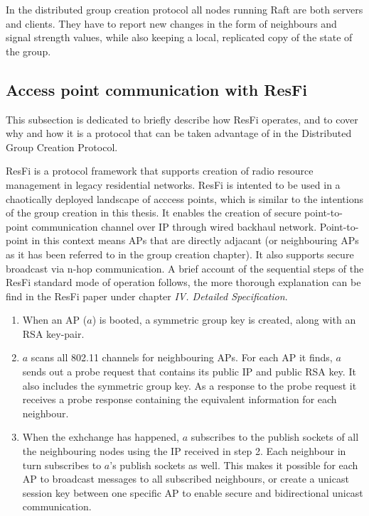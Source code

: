 In the distributed group creation protocol all nodes running Raft are both servers and clients. They have to report new changes in the form of neighbours and signal strength values,
while also keeping a local, replicated copy of the state of the group.

\subsection{Access point communication with ResFi}
This subsection is dedicated to briefly describe how ResFi operates, and to cover why and how it is a protocol that can be taken advantage of in the Distributed Group Creation Protocol. 

ResFi is a protocol framework that supports creation of radio resource management in legacy residential networks. ResFi is intented to be used in  a chaotically deployed landscape of acccess points,
which is similar to the intentions of the group creation in this thesis. It enables the creation of secure point-to-point communication channel over IP through wired backhaul network. 
Point-to-point in this context means APs that are directly adjacant (or neighbouring APs as it has been referred to in the group creation chapter).
It also supports secure broadcast via n-hop communication. A brief account of the sequential steps of the ResFi standard mode of operation follows,
the more thorough explanation can be find in the ResFi paper \cite{resfi} under chapter \textit{IV. Detailed Specification}.

\begin{enumerate}
	\item When an AP ($a$) is booted, a symmetric group key is created, along with an RSA key-pair. 
	\item $a$ scans all 802.11 channels for neighbouring APs. For each AP it finds, $a$ sends out a probe request that contains its public IP and public RSA key. It also includes
		the symmetric group key. As a response to the probe request it receives a probe response containing the equivalent information for each neighbour. 
	\item When the exhchange has happened, $a$ subscribes to the publish sockets of all the neighbouring nodes using the IP received in step 2. Each neighbour in turn subscribes to $a$'s
		publish sockets as well. This makes it possible for each AP to broadcast messages to all subscribed neighbours,
		or create a unicast session key between one specific AP to enable secure and bidirectional unicast communication.
\end{enumerate}


